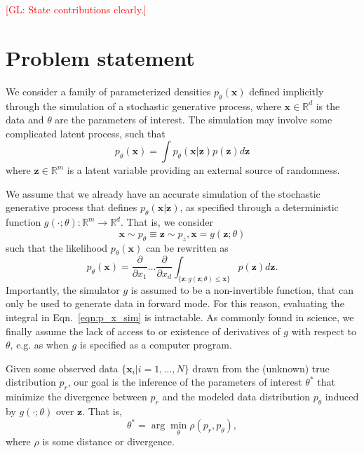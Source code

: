 \documentclass[twocolumn,superscriptaddress,aps]{revtex4-1}
\newcommand{\glnote}[1]{\textcolor{red}{[GL: #1]}}
\theoremstyle{plain}
\begin{document}
\glnote{State contributions clearly.}



\section{Problem statement}
\label{sec:problem}

We consider a family of parameterized densities $p_\theta(\mathbf{x})$
defined implicitly through the simulation of a stochastic generative process,
where $\mathbf{x} \in \mathbb{R}^d$ is the data and $\theta$ are the
parameters of interest. The simulation may involve some complicated latent
process, such that
\begin{equation}\label{eqn:p_x}
    p_\theta(\mathbf{x}) = \int p_\theta(\mathbf{x}|\mathbf{z}) p(\mathbf{z}) d\mathbf{z}
\end{equation}
where $\mathbf{z} \in \mathbb{R}^m$ is a latent variable providing an external source
of randomness.

We assume that we already have an accurate simulation of the stochastic
generative process that defines $p_\theta(\mathbf{x}|\mathbf{z})$, as
specified through a deterministic function $g(\cdot; \theta) : \mathbb{R}^m \to
\mathbb{R}^d$. That is, we consider
\begin{equation}\label{eqn:p_theta}
    \mathbf{x} \sim p_\theta \equiv \mathbf{z} \sim p_z, \mathbf{x} = g(\mathbf{z}; \theta)
\end{equation}
such that the likelihood $p_\theta(\mathbf{x})$ can be rewritten as
\begin{equation}\label{eqn:p_x_sim}
    p_\theta(\mathbf{x}) = \frac{\partial}{\partial x_1} \dots \frac{\partial}{\partial x_d} \int_{\{\mathbf{z}:g(\mathbf{z};\theta) \leq \mathbf{x}\}} p(\mathbf{z}) d\mathbf{z}.
\end{equation}
Importantly, the simulator $g$ is assumed to be a non-invertible function, that can only be
used to generate data in forward mode. For this reason, evaluating the integral
in Eqn.~\ref{eqn:p_x_sim} is intractable. As commonly found
in science, we finally assume the lack of access to or existence of derivatives of $g$ with respect to $\theta$,
e.g. as when $g$ is specified as a computer program.

Given some observed data $\{ \mathbf{x}_i | i=1, \dots, N \}$ drawn from the
(unknown) true distribution $p_r$, our goal is the inference of the parameters
of interest $\theta^*$ that minimize the divergence between $p_r$ and
the modeled data distribution $p_\theta$ induced by $g(\cdot;
\theta)$ over $\mathbf{z}$. That is,
\begin{equation}
    \theta^* = \arg \min_\theta \rho(p_r, p_\theta),
\end{equation}
where $\rho$ is some distance or divergence.
\end{document}
